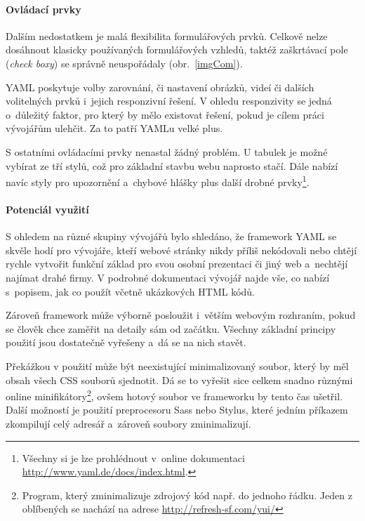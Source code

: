 \documentclass[thesis=B,czech]{FITthesis}[2012/06/26]
\begin{document}
\paragraph{Ovládací prvky}

Dalším nedostatkem je malá flexibilita formulářových prvků. Celkově nelze dosáhnout klasicky používaných formulářových vzhledů, taktéž zaškrtávací pole (\textit{check boxy}) se správně neuspořádaly (obr.~\ref{imgCom}). 

YAML poskytuje volby zarovnání, či nastavení obrázků, videí či dalších volitelných prvků i~jejich responzivní řešení. V ohledu responzivity se jedná o~důležitý faktor, pro který by mělo existovat řešení, pokud je cílem práci vývojářům ulehčit. Za to patří YAMLu velké plus.


S ostatními ovládacími prvky nenastal žádný problém. U tabulek  je možné vybírat ze tří stylů, což pro základní stavbu webu naprosto stačí. Dále nabízí navíc styly pro upozornění a~chybové hlášky plus další drobné prvky\footnote{Všechny si je lze prohlédnout v~online dokumentaci \url{http://www.yaml.de/docs/index.html}.}. 

\paragraph{Potenciál využití}

S ohledem na různé skupiny vývojářů bylo shledáno, že framework YAML se skvěle hodí pro vývojáře, kteří webové stránky nikdy příliš nekódovali nebo chtějí rychle vytvořit funkční základ pro svou osobní prezentaci či jiný web a~nechtějí najímat drahé firmy. V podrobné dokumentaci vývojář najde vše, co nabízí s~popisem, jak co použít včetně ukázkových HTML kódů.

Zároveň framework může výborně posloužit i~větším webovým rozhraním, pokud se člověk chce zaměřit na detaily sám od začátku. Všechny základní principy použití jsou dostatečně vyřešeny a~dá se na nich stavět. 

Překážkou v použití může být neexistující minimalizovaný soubor, který by měl obsah  všech CSS souborů sjednotit. Dá se to vyřešit sice celkem snadno různými online minifikátory\footnote{Program, který zminimalizuje zdrojový kód např. do jednoho řádku. Jeden z oblíbených se nachází na adrese \url{http://refresh-sf.com/yui/}}, ovšem hotový soubor ve frameworku by tento čas ušetřil. Další možností je použití preprocesoru Sass nebo Stylus, které jedním příkazem zkompilují celý adresář a~zároveň soubory zminimalizují.
\end{document}
